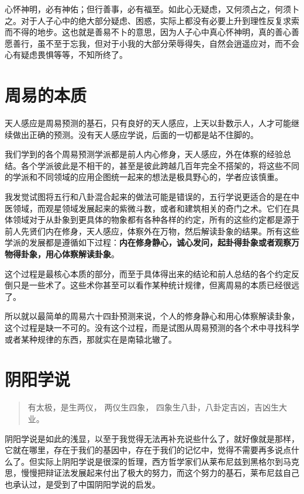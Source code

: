 \documentclass[12pt,oneside]{book}
\begin{document}
心怀神明，必有神佑；但行善事，必有福至。如此心无疑虑，又何须占之，何须卜之。对于人子心中的绝大部分疑虑、困惑，实际上都没有必要上升到理性反复求索而不得的地步。这也就是善易不卜的意思，因为人子心中真心怀神明，真的善心善愿善行，虽不至于忘我，但对于小我的大部分荣辱得失，自然会逍遥应对，而不会心有疑虑畏惧等等，不知所终了。




\section{周易的本质}
天人感应是周易预测的基石，只有良好的天人感应，上天以卦数示人，人才可能继续做出正确的预测。没有天人感应学说，后面的一切都是站不住脚的。

我们学到的各个周易预测学派都是前人内心修身，天人感应，外在体察的经验总结。各个学派彼此是不相干的，甚至是彼此跨越几百年完全不搭架的，将这些不同的学派和不同领域的应用企图统一起来的想法是极具野心的，学者应该慎重。

我发觉试图将五行和八卦混合起来的做法可能是错误的，五行学说更适合的是在中医领域，而观星领域发展起来的紫微斗数，或者和建筑相关的奇门之术。它们在具体领域对于从卦象到更具体的物象都有各种各样的约定，所有的这些约定都是源于前人先贤们内在修身，天人感应，体察外在万物，然后解读卦象的结果。所有这些学派的发展都是遵循如下过程：\textbf{内在修身静心，诚心发问，起卦得卦象或者观察万物得卦象，用心体察解读卦象}。

这个过程是最核心本质的部分，而至于具体得出来的结论和前人总结的各个约定反倒只是一些术了。这些术你甚至可以看作某种统计规律，但离周易的本质已经很远了。

所以就以最简单的周易六十四卦预测来说，个人的修身静心和用心体察解读卦象，这个过程是缺一不可的。没有这个过程，而是试图从周易预测的各个术中寻找科学或者某种规律的东西，那就实在是南辕北辙了。



\section{阴阳学说}
\begin{quote}
有太极，是生两仪， 两仪生四象， 四象生八卦，八卦定吉凶，吉凶生大业。
\end{quote}


阴阳学说是如此的浅显，以至于我觉得无法再补充说些什么了，就好像就是那样，它就在哪里，存在于我们的基因中，存在于我们的记忆中，觉得不需要再多说点什么了。但实际上阴阳学说是很深的哲理，西方哲学家们从莱布尼兹到黑格尔到马克思，慢慢把辩证法发展起来付出了极大的努力，而这个努力的基石，莱布尼兹自己也承认过，是受到了中国阴阳学说的启发。
\end{document}
